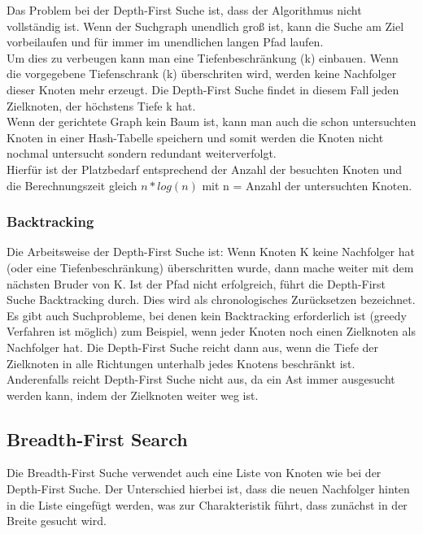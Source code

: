 \documentclass[fleqn]{article}
\numberwithin{equation}{section}
\numberwithin{figure}{section}
\numberwithin{table}{section}
\begin{document}
Das Problem bei der Depth-First Suche ist, dass der Algorithmus nicht vollständig ist. Wenn der Suchgraph unendlich groß ist, kann die Suche am Ziel vorbeilaufen und für immer im unendlichen langen Pfad laufen.\\

Um dies zu verbeugen kann man eine Tiefenbeschränkung (k) einbauen. Wenn die vorgegebene Tiefenschrank (k) überschriten wird, werden keine Nachfolger dieser Knoten mehr erzeugt. Die Depth-First Suche findet in diesem Fall jeden Zielknoten, der höchstens Tiefe k hat.\\

Wenn der gerichtete Graph kein Baum ist, kann man auch die schon untersuchten Knoten in einer Hash-Tabelle speichern und somit werden die Knoten nicht nochmal untersucht sondern redundant weiterverfolgt.\\

Hierfür ist der Platzbedarf entsprechend der Anzahl der besuchten Knoten und die Berechnungszeit gleich $n*log(n)$ mit n = Anzahl der untersuchten Knoten.\\

\subsubsection{Backtracking}
\bigskip
Die Arbeitsweise der Depth-First Suche ist: Wenn Knoten K keine Nachfolger hat (oder eine Tiefenbeschränkung) überschritten wurde, dann mache weiter mit dem nächsten Bruder von K. Ist der Pfad nicht erfolgreich, führt die Depth-First Suche Backtracking durch. Dies wird als chronologisches Zurücksetzen bezeichnet.\\

Es gibt auch Suchprobleme, bei denen kein Backtracking erforderlich ist (greedy Verfahren ist möglich) zum Beispiel, wenn jeder Knoten noch einen Zielknoten als Nachfolger hat. Die Depth-First Suche reicht dann aus, wenn die Tiefe der Zielknoten in alle Richtungen unterhalb jedes Knotens beschränkt ist. Anderenfalls reicht Depth-First Suche nicht aus, da ein Ast immer ausgesucht werden kann, indem der Zielknoten weiter weg ist.\\

\subsection{Breadth-First Search}
\bigskip
Die Breadth-First Suche verwendet auch eine Liste von Knoten wie bei der Depth-First Suche. Der Unterschied hierbei ist, dass die neuen Nachfolger hinten in die Liste eingefügt werden, was zur Charakteristik führt, dass zunächst in der Breite gesucht wird.\\
\end{document}
